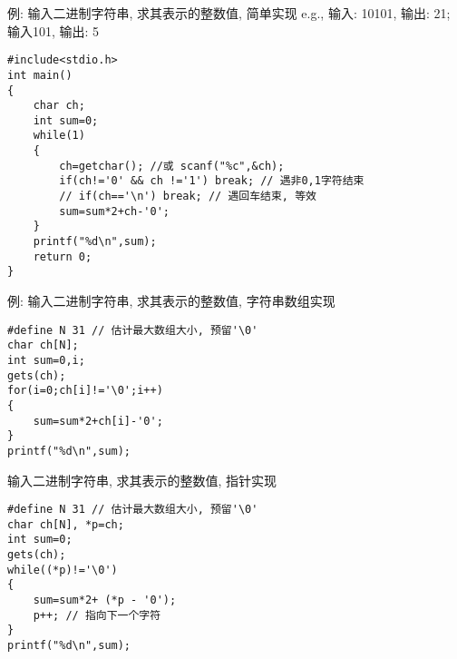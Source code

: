 \begin{frame}{例: 输入二进制字符串, 求其表示的整数值, 简单实现}
e.g., 输入: 10101, 输出: 21; \quad 输入101, 输出:  5
\begin{lstlisting}
#include<stdio.h>
int main()
{
	char ch;
	int sum=0;
	while(1)
	{
		ch=getchar(); //或 scanf("%c",&ch);
		if(ch!='0' && ch !='1') break; // 遇非0,1字符结束
		// if(ch=='\n') break; // 遇回车结束, 等效
		sum=sum*2+ch-'0'; 
	} 
	printf("%d\n",sum);
	return 0;
}
\end{lstlisting}
\end{frame}

\begin{frame}[fragile]{例: 输入二进制字符串, 求其表示的整数值, 字符串数组实现}
\begin{lstlisting}
#define N 31 // 估计最大数组大小, 预留'\0'
char ch[N];
int sum=0,i;
gets(ch);
for(i=0;ch[i]!='\0';i++)
{
	sum=sum*2+ch[i]-'0';
} 
printf("%d\n",sum);
\end{lstlisting}
\end{frame}

\begin{frame}[fragile]{输入二进制字符串, 求其表示的整数值, 指针实现}
\begin{lstlisting}
#define N 31 // 估计最大数组大小, 预留'\0'
char ch[N], *p=ch;
int sum=0;
gets(ch);
while((*p)!='\0')
{
	sum=sum*2+ (*p - '0');
	p++; // 指向下一个字符
} 
printf("%d\n",sum);
\end{lstlisting}
\end{frame}







